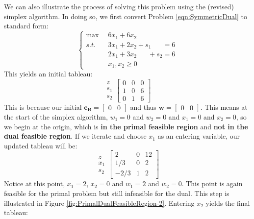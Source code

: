 We can also illustrate the process of solving this problem using the (revised) simplex algorithm. In doing so, we first convert Problem \ref{eqn:SymmetricDual} to standard form:
\begin{equation}
\left\{
\begin{aligned}
\max\;\; & 6x_1 + 6x_2 \\
s.t.\;\; & 3x_1 + 2x_2 + s_1 \phantom{+s_2}= 6\\
 & 2x_1 + 3x_2 \phantom{+s_1} + s_2 = 6\\
 & x_1, x_2 \geq 0
\end{aligned}\right.
\label{eqn:SymmetricDual}
\end{equation}
This yields an initial tableau:
\begin{equation}
\begin{array}{c}
z\\
s_1\\
s_2
\end{array}
\left[
\begin{array}{cc|c}
0	&	0	&	0\\
\hline
1	&	0	&   6\\
0	&	1	&	6
\end{array}
\right]
\end{equation}
This is because our initial $\mathbf{c}_\mathbf{B} = \begin{bmatrix}0&0\end{bmatrix}$ and thus $\mathbf{w} = \begin{bmatrix}0&0\end{bmatrix}$. This means at the start of the simplex algorithm, $w_1 = 0$ and $w_2 = 0$ and $x_1 = 0$ and $x_2 = 0$, so we begin at the origin, which is \textbf{in the primal feasible region} and \textbf{not in the dual feasible region}. If we iterate and choose $x_1$ as an entering variable, our updated tableau will be:
\begin{equation}
\begin{array}{c}
z\\
x_1\\
s_2
\end{array}
\left[
\begin{array}{cc|c}
2	&	0	&	12\\
\hline
1/3	&	0	&   2\\
-2/3	&	1	&	2
\end{array}
\right]
\end{equation}
Notice at this point, $x_1 = 2$, $x_2 = 0$ and $w_1 = 2$ and $w_2 = 0$. This point is again feasible for the primal problem but still infeasible for the dual. This step is illustrated in Figure \ref{fig:PrimalDualFeasibleRegion-2}. Entering $x_2$ yields the final tableau:
